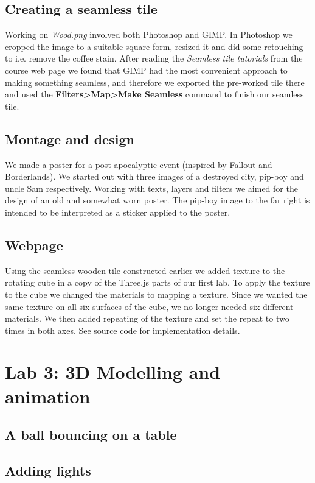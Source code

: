 \documentclass[a4paper]{article}
\begin{document}
\subsection{Creating a seamless tile} %
Working on \textit{Wood.png} involved both Photoshop and GIMP. In Photoshop we cropped the image to a suitable square form, resized it and did some retouching to i.e. remove the coffee stain. After reading the \textit{Seamless tile tutorials} from the course web page we found that GIMP had the most convenient approach to making something seamless, and therefore we exported the pre-worked tile there and used the \textbf{Filters>Map>Make Seamless} command to finish our seamless tile.

\subsection{Montage and design} %
We made a poster for a post-apocalyptic event (inspired by Fallout and Borderlands). We started out with three images of a destroyed city, pip-boy and uncle Sam respectively. Working with texts, layers and filters we aimed for the design of an old and somewhat worn poster. The pip-boy image to the far right is intended to be interpreted as a sticker applied to the poster. 

\subsection{Webpage} %
Using the seamless wooden tile constructed earlier we added texture to the rotating cube in a copy of the Three.js parts of our first lab. To apply the texture to the cube we changed the materials to mapping a texture. Since we wanted the same texture on all six surfaces of the cube, we no longer needed six different materials. We then added repeating of the texture and set the repeat to two times in both axes. See source code for implementation details.

\section{Lab 3: 3D Modelling and animation}

\subsection{A ball bouncing on a table} %

\subsection{Adding lights} %
\end{document}
